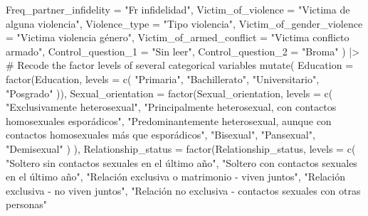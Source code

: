 \documentclass[
  bookmarksnumbered]{article}
\newenvironment{Shaded}{\begin{snugshade}}{\end{snugshade}}
\newcommand{\AttributeTok}[1]{\textcolor[rgb]{0.80,0.80,0.80}{#1}}
\newcommand{\CommentTok}[1]{\textcolor[rgb]{0.50,0.62,0.50}{#1}}
\newcommand{\FunctionTok}[1]{\textcolor[rgb]{0.94,0.94,0.56}{#1}}
\newcommand{\NormalTok}[1]{\textcolor[rgb]{0.80,0.80,0.80}{#1}}
\newcommand{\SpecialCharTok}[1]{\textcolor[rgb]{0.86,0.64,0.64}{#1}}
\newcommand{\StringTok}[1]{\textcolor[rgb]{0.80,0.58,0.58}{#1}}
\begin{document}
\begin{Shaded}
\begin{Highlighting}[]
    \AttributeTok{Freq\_partner\_infidelity =} \StringTok{"Fr infidelidad"}\NormalTok{,}
    \AttributeTok{Victim\_of\_violence =} \StringTok{"Victima de alguna violencia"}\NormalTok{,}
    \AttributeTok{Violence\_type =} \StringTok{"Tipo violencia"}\NormalTok{,}
    \AttributeTok{Victim\_of\_gender\_violence =} \StringTok{"Victima violencia género"}\NormalTok{,}
    \AttributeTok{Victim\_of\_armed\_conflict =} \StringTok{"Victima conflicto armado"}\NormalTok{,}
    \AttributeTok{Control\_question\_1 =} \StringTok{"Sin leer"}\NormalTok{,}
    \AttributeTok{Control\_question\_2 =} \StringTok{"Broma"}
\NormalTok{  ) }\SpecialCharTok{|\textgreater{}}
  \CommentTok{\# Recode the factor levels of several categorical variables}
  \FunctionTok{mutate}\NormalTok{(}
    \AttributeTok{Education =} \FunctionTok{factor}\NormalTok{(Education, }\AttributeTok{levels =} \FunctionTok{c}\NormalTok{(}
      \StringTok{"Primaria"}\NormalTok{,}
      \StringTok{"Bachillerato"}\NormalTok{,}
      \StringTok{"Universitario"}\NormalTok{,}
      \StringTok{"Posgrado"}
\NormalTok{    )),}
    \AttributeTok{Sexual\_orientation =} \FunctionTok{factor}\NormalTok{(Sexual\_orientation,}
                                \AttributeTok{levels =} \FunctionTok{c}\NormalTok{(}
                                  \StringTok{"Exclusivamente heterosexual"}\NormalTok{,}
                                  \StringTok{"Principalmente heterosexual, con contactos homosexuales esporádicos"}\NormalTok{,}
                                  \StringTok{"Predominantemente heterosexual, aunque con contactos homosexuales más que esporádicos"}\NormalTok{,}
                                  \StringTok{"Bisexual"}\NormalTok{,}
                                  \StringTok{"Pansexual"}\NormalTok{,}
                                  \StringTok{"Demisexual"}
\NormalTok{                                )}
\NormalTok{    ),}
    \AttributeTok{Relationship\_status =} \FunctionTok{factor}\NormalTok{(Relationship\_status,}
                                 \AttributeTok{levels =} \FunctionTok{c}\NormalTok{(}
                                   \StringTok{"Soltero sin contactos sexuales en el último año"}\NormalTok{,}
                                   \StringTok{"Soltero con contactos sexuales en el último año"}\NormalTok{,}
                                   \StringTok{"Relación exclusiva o matrimonio {-} viven juntos"}\NormalTok{,}
                                   \StringTok{"Relación exclusiva {-} no viven juntos"}\NormalTok{,}
                                   \StringTok{"Relación no exclusiva {-} contactos sexuales con otras personas"}

\end{Highlighting}
\end{Shaded}
\end{document}
